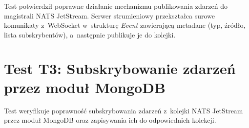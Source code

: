 Test potwierdził poprawne działanie mechanizmu publikowania zdarzeń do magistrali NATS JetStream.
Serwer strumieniowy przekształca surowe komunikaty z~WebSocket w~strukturę \textit{Event} zawierającą metadane (typ,
źródło, lista subskrybentów), a~następnie publikuje je do kolejki.

\newpage


\section{Test T3: Subskrybowanie zdarzeń przez moduł MongoDB}
\label{sec:test_mongo_subscribe}

Test weryfikuje poprawność subskrybowania zdarzeń z~kolejki NATS JetStream przez moduł MongoDB oraz zapisywania ich do
odpowiednich kolekcji.

\vspace{0.5cm}

